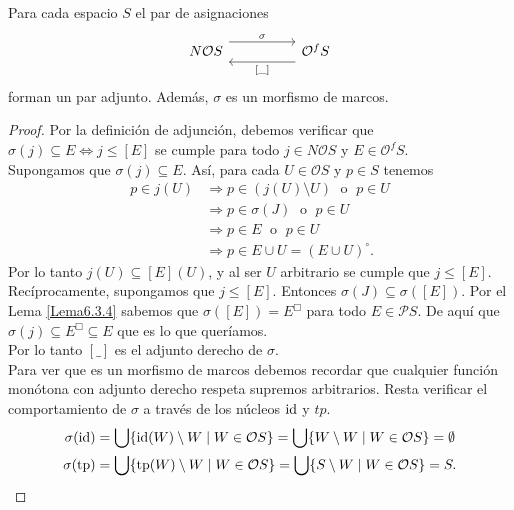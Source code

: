 \begin{thm}\label{Teorema6.3.5}
    Para cada espacio $S$ el par de asignaciones 
    \[\begin{tikzcd}
	{N\mathcal{O}S} && {\mathcal{O}^fS}
	\arrow["\sigma", shift left=3, from=1-1, to=1-3]
	\arrow["{[ \_ ]}", shift left=3, from=1-3, to=1-1]
\end{tikzcd}\]
forman un par adjunto. Además, $\sigma$ es un morfismo de marcos.
\end{thm}

\begin{proof}
    Por la definición de adjunción, debemos verificar que $\sigma(j)\subseteq E\Leftrightarrow j\leq [E]$ se cumple para todo $j\in N\mathcal{O}S$ y $E\in \mathcal{O}^fS$.\\

    Supongamos que $\sigma(j)\subseteq E$. Así, para cada $U\in \mathcal{O}S$ y $p\in S$ tenemos 
    \[
    \begin{split}
        p\in j(U) &\Rightarrow  p\in (j(U)\setminus U)\;\mbox{ o }\; p\in U\\
        & \Rightarrow p\in \sigma(J) \; \mbox{ o }\; p\in U\\
        & \Rightarrow p\in E \;\mbox{ o }\; p\in U\\
        & \Rightarrow p\in E\cup U=(E\cup U)^\circ.
    \end{split}
    \]
    Por lo tanto $j(U)\subseteq [E](U)$, y al ser $U$ arbitrario se cumple que $j\leq [E]$.\\

    Recíprocamente, supongamos que $j\leq [E]$. Entonces $\sigma(J)\subseteq \sigma([E])$. Por el Lema \ref{Lema6.3.4} sabemos que $\sigma([E])=E^\Box$ para todo $E\in \mathcal{P}S$. De aquí que $\sigma(j)\subseteq E^\Box\subseteq E$ que es lo que queríamos.\\

    Por lo tanto $[ \_ ]$ es el adjunto derecho de $\sigma$.\\

    Para ver que es un morfismo de marcos debemos recordar que cualquier función monótona con adjunto derecho respeta supremos arbitrarios. Resta verificar el comportamiento de $\sigma$ a través de los núcleos $\mathrm{id}$ y $tp$.
    \[
    \begin{split}
    \sigma(\mathrm{id})& =\bigcup\{\mathrm{id}(W)\setminus W\mid W\in \mathcal{O}S\}=\bigcup\{W\setminus W\mid W\in \mathcal{O}S\}=\emptyset\\
    \sigma(\mathrm{tp})& =\bigcup\{\mathrm{tp}(W)\setminus W\mid W\in \mathcal{O}S\}=\bigcup\{S\setminus W\mid W\in \mathcal{O}S\}=S.
    \end{split}
    \]
\end{proof}

